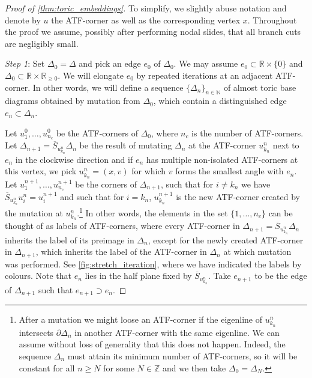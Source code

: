 \documentclass[12pt,a4paper,abstract=true,draft]{scrartcl}
\begin{document}
\begin{proof}[Proof of \cref{thm:toric_embeddings}]
To simplify, we slightly abuse notation and denote by $u$ the ATF-corner as well as the corresponding vertex $x$. Throughout the proof we assume, possibly after performing nodal slides, that all branch cuts are negligibly small.

\medskip

\emph{Step 1}:
Set $Δ_0 = Δ$ and pick an edge $e_0$ of $Δ_0$.
We may assume $e_0 ⊂ ℝ × \{0\}$ and $Δ_0 ⊂ ℝ × ℝ_{ ≥0}$.
We will elongate $e_0$ by repeated iterations at an adjacent ATF-corner.
In other words, we will define a sequence $\{\Delta_n\}_{n \in  \mathbb{N}}$ of almost toric base diagrams obtained by mutation from $\Delta_0$, which contain a distinguished edge $e_n \subset \Delta_n$.

Let $u_1^0,…,u_{n_c}^0$ be the ATF-corners of $Δ_0$, where $n_c$ is the number of ATF-corners.
Let $Δ_{n+1} = \overline{S}_{u_{k_n}^n} Δ_n$ be the result of mutating $Δ_n$ at the ATF-corner $u_{k_n}^n$ next to $e_n$ in the clockwise direction and if $e_n$ has multiple non-isolated ATF-corners at this vertex, we pick $u_{k_n}^n = (x,v)$ for which $v$ forms the smallest angle with $e_n$.
Let $u_1^{n+1},…,u_{n_c}^{n+1}$ be the corners of $Δ_{n+1}$, such that for $i ≠ k_n$ we have $\overline{S}_{u_{k_n}^n} u_i^n = u_i^{n+1}$ and such that for $i=k_n$, $u_{k_n}^{n+1}$ is the new ATF-corner created by the mutation at $u_{k_n}^n$.\footnote{After a mutation we might loose an ATF-corner if the eigenline of $u_{k_n}^n$ intersects $∂Δ_n$ in another ATF-corner with the same eigenline.
We can assume without loss of generality that this does not happen. Indeed, the sequence $Δ_n$ must attain its minimum number of ATF-corners, so it will be constant for all $n ≥N$ for some $N ∈ ℤ$ and we then take $Δ_0=Δ_N$.} In other words, the elements in the set $\{1,\ldots,n_c\}$ can be thought of as labels of ATF-corners, where every ATF-corner in $Δ_{n+1} = \overline{S}_{u_{k_n}^n} Δ_n$ inherits the label of its preimage in $\Delta_n$, except for the newly created ATF-corner in $\Delta_{n+1}$, which inherits the label of the ATF-corner in $\Delta_n$ at which mutation was performed.
See \cref{fig:stretch_iteration}, where we have indicated the labels by colours.
Note that $e_n$ lies in the half plane fixed by $\overline{S}_{u_{k_n}^n}$.
Take $e_{n+1}$ to be the edge of $Δ_{n+1}$ such that $e_{n+1} ⊃ e_n$.


\end{proof}
\end{document}
